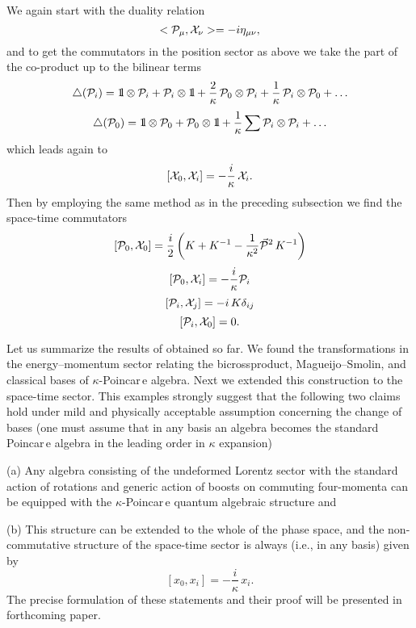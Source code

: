 \documentclass[a4paper,a4paper]{article}
\def\bbbone{{\mathchoice {\rm 1\mskip-4mu l} {\rm 1\mskip-4mu l}
{\rm 1\mskip-4.5mu l} {\rm 1\mskip-5mu l}}}
\begin{document}
We again start with the duality relation
$$
 <{\cal P}_\mu, {\cal X}_\nu> =  -i \eta_{\mu\nu},
$$
and to get the commutators in the position sector as above we take
 the part of the co-product up to the bilinear terms
$$
  \triangle({\cal P}_{i})=\bbbone \otimes {\cal P}_{i} + {\cal P}_{i} \otimes \bbbone +
  {\frac{2}{\kappa}}\, {\cal P}_{0} \otimes {\cal P}_{i} + {\frac{1}{\kappa}}\, {\cal P}_{i} \otimes {\cal P}_{0} + \ldots
$$
$$
  \triangle({\cal P}_{0})= \bbbone \otimes {\cal P}_{0} + {\cal P}_{0} \otimes \bbbone +
  \frac{1}{\kappa}\sum {\cal P}_{i}\otimes {\cal P}_{i}+ \ldots
$$
which leads again to
\begin{equation}\label{20}
  [{\cal X}_0, {\cal X}_i] = -\frac{i}\kappa\, {\cal X}_i.
\end{equation}
Then by employing the same method as in the preceding subsection
we find the space-time commutators
\begin{equation}\label{21a}
 [{\cal P}_0, {\cal X}_0] = \frac{i}2\left(K + K^{-1}- \frac1{\kappa^2}\vec{{\cal
    P}}{}^2\, K^{-1}\right)
\end{equation}
\begin{equation}\label{21b}
 [{\cal P}_0, {\cal X}_i] =  -\frac{i}\kappa {\cal P}_i
\end{equation}
\begin{equation}\label{21c}
  [{\cal P}_i, {\cal X}_j] = - i \, K\delta_{ij}
\end{equation}
\begin{equation}\label{21d}
 [{\cal P}_i, {\cal X}_0] = 0.
\end{equation}
\vspace{12pt}

Let us summarize the results of obtained so far. We found the
transformations in the energy--momentum sector relating the
bicrossproduct, Magueijo--Smolin, and classical bases of
$\kappa$-Poincar\,e algebra. Next we extended this construction to
the space-time sector. This examples strongly suggest that the
following two claims hold under mild and physically acceptable
assumption concerning the change of bases (one must assume that in
any basis  an algebra becomes the standard Poincar\,e algebra in
the leading order in $\kappa$ expansion)

(a) Any algebra
consisting of the undeformed Lorentz sector  with the standard
action of rotations and generic action of boosts on commuting
four-momenta can be equipped with the $\kappa$-Poincar\,e quantum
algebraic structure and

(b) This structure can be extended to the whole of the phase
space, and the non-commutative structure of the space-time sector
is always (i.e., in any basis) given by
\begin{equation}\label{22}
  [x_0, x_i] =-\frac{i}\kappa\, x_i.
\end{equation}
The precise formulation of these statements and their proof will
be presented in forthcoming paper.
\end{document}
